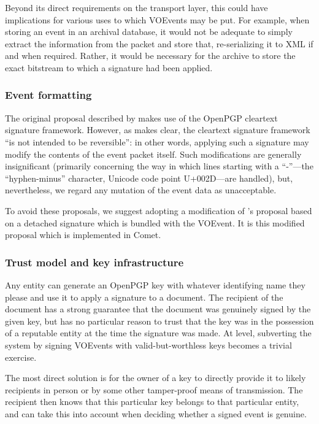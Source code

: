 \documentclass[5p,authoryear]{elsarticle}
\begin{document}
Beyond its direct requirements on the transport layer, this could have
implications for various uses to which VOEvents may be put. For example, when
storing an event in an archival database, it would not be adequate to simply
extract the information from the packet and store that, re-serializing it to
XML if and when required. Rather, it would be necessary for the archive to
store the exact bitstream to which a signature had been applied.

\subsubsection{Event formatting}

The original proposal described by \citet{Denny:2008} makes use of the OpenPGP
cleartext signature framework. However, as \citet[\S7]{Callas:2007} makes clear, the
cleartext signature framework ``is not intended to be reversible'': in other
words, applying such a signature may modify the contents of the event packet
itself. Such modifications are generally insignificant (primarily concerning
the way in which lines starting with a ``-''---the ``hyphen-minus'' character,
Unicode code point U+002D---are handled), but, nevertheless, we regard any
mutation of the event data as unacceptable.

To avoid these proposals, we suggest adopting a modification of
\citeauthor{Denny:2008}'s proposal based on a detached signature
\citep[\S11.4]{Callas:2007} which is bundled with the VOEvent. It is this
modified proposal which is implemented in Comet.

\subsubsection{Trust model and key infrastructure}

Any entity can generate an OpenPGP key with whatever identifying name they
please and use it to apply a signature to a document. The recipient of the
document has a strong guarantee that the document was genuinely signed by the
given key, but has no particular reason to trust that the key was in the
possession of a reputable entity at the time the signature was made. At level,
subverting the system by signing VOEvents with valid-but-worthless keys
becomes a trivial exercise.

The most direct solution is for the owner of a key to directly provide it to
likely recipients in person or by some other tamper-proof means of
transmission. The recipient then knows that this particular key belongs to
that particular entity, and can take this into account when deciding whether a
signed event is genuine.
\end{document}
